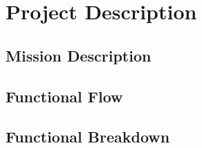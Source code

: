 \chapter{Project Description}
\setlength{\parindent}{15pt}
\label{ch:proj_desc}

\section{Mission Description}
\label{sec:miss_desc}

\section{Functional Flow}
\label{sec:func_flow}

\section{Functional Breakdown}
\label{sec:func_brea}


